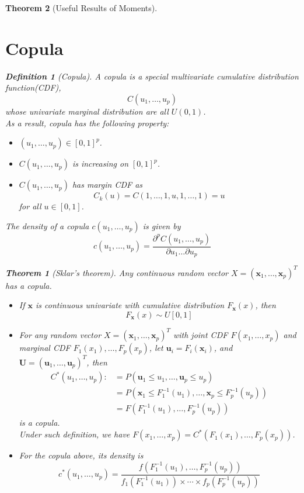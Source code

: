 \documentclass[11pt]{article}
\newtheorem{definition}{Definition}[section]
\newtheorem{theorem}{Theorem}[section]
\theoremstyle{definition}
\begin{document}
\begin{theorem}[Useful Results of Moments]
\section{Copula}
\begin{definition}[Copula]
\normalfont A copula is a special multivariate cumulative distribution function(CDF), 
\[
C(u_1, \ldots, u_p)
\]
whose univariate marginal distribution are all $U(0,1)$.\\
As a result, copula has the following property:
\begin{itemize}
  \item $(u_1, \ldots, u_p)\in [0,1]^p$.
  \item $C(u_1,\ldots, u_p)$ is increasing on $[0,1]^p$.
  \item $C(u_1,\ldots, u_p)$ has margin CDF as
  \[
C_k(u)=C(1,\ldots, 1, u, 1,\ldots, 1) = u
  \]
  for all $u\in [0,1]$.
\end{itemize}
The density of a copula $c(u_1,\ldots, u_p)$ is given by
\[
c(u_1,\ldots, u_p) = \frac{\partial^p C(u_1,\ldots, u_p)}{\partial u_1 \ldots \partial u_p}
\]
\end{definition}
\begin{theorem}[Sklar's theorem]
\normalfont Any continuous random vector $X=(\mathbf{x}_1,\ldots, \mathbf{x}_p)^T$ has a copula.
\begin{itemize}
  \item If $\mathbf{x}$ is continuous univariate with cumulative distribution $F_{\mathbf{x}}(x)$, then 
  \[
F_{\mathbf{x}}(x)\sim U[0,1]
  \]
  \item For any random vector $X=(\mathbf{x}_1,\ldots, \mathbf{x}_p)^T$ with joint CDF $F(x_1,\ldots, x_p)$ and marginal CDF $F_1(x_1),\ldots, F_p(x_p)$, let $\mathbf{u}_i=F_i(\mathbf{x}_i)$, and $\mathbf{U}=(\mathbf{u}_1,\ldots, \mathbf{u}_p)^T$, then
  \begin{align*}
C^\ast(u_1,\ldots, u_p):&=P(\mathbf{u}_1\leq u_1, \ldots, \mathbf{u}_p\leq u_p)\\
&=P(\mathbf{x}_1\leq F_1^{-1}(u_1),\ldots, \mathbf{x}_p\leq F_p^{-1}(u_p))\\
&=F(F_1^{-1}(u_1), \ldots,F_p^{-1}(u_p))
  \end{align*}
  is a copula.\\
  Under such definition, we have $F(x_1,\ldots, x_p)=C^\ast(F_1(x_1),\ldots, F_p(x_p))$.
  \item For the copula above, its density is
  \[
c^\ast(u_1,\ldots, u_p)=\frac{f(F_1^{-1}(u_1), \ldots, F_p^{-1}(u_p))}{f_1(F_1^{-1}(u_1))\times\cdots\times f_p(F_p^{-1}(u_p))}
\]
\end{itemize}
\end{theorem}
\end{theorem}
\end{document}
